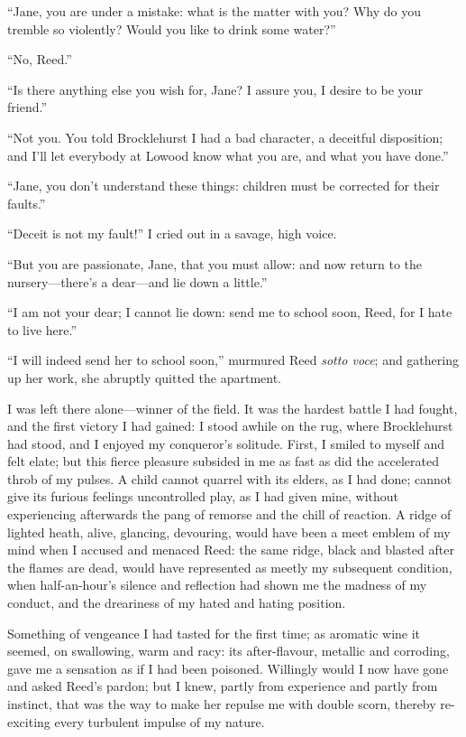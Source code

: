 \enquote{Jane, you are under a mistake: what is the matter with you? 
Why do you tremble so violently? Would you like to drink some water?}

\enquote{No, \Mrs{} Reed.}

\enquote{Is there anything else you wish for, Jane? I assure you, I
desire to be your friend.}

\enquote{Not you. You told \Mr{} Brocklehurst I had a bad character, a
deceitful disposition; and I'll let everybody at Lowood know what you
are, and what you have done.}

\enquote{Jane, you don't understand these things: children must be
corrected for their faults.}

\enquote{Deceit is not my fault!} I cried out in a savage, high voice.

\enquote{But you are passionate, Jane, that you must allow: and now
return to the nursery---there's a dear---and lie down a little.}

\enquote{I am not your dear; I cannot lie down: send me to school soon,
\Mrs{} Reed, for I hate to live here.}

\enquote{I will indeed send her to school soon,} murmured \Mrs{} Reed
\emph{sotto voce}; and gathering up her work, she abruptly quitted the
apartment.

I was left there alone---winner of the field. It was the hardest battle
I had fought, and the first victory I had gained: I stood awhile on the
rug, where \Mr{} Brocklehurst had stood, and I enjoyed my conqueror's
solitude. First, I smiled to myself and felt elate; but this fierce
pleasure subsided in me as fast as did the accelerated throb of my
pulses. A child cannot quarrel with its elders, as I had done; cannot
give its furious feelings uncontrolled play, as I had given mine,
without experiencing afterwards the pang of remorse and the chill of
reaction. A ridge of lighted heath, alive, glancing, devouring, would
have been a meet emblem of my mind when I accused and menaced \Mrs{} Reed:
the same ridge, black and blasted after the flames are dead, would have
represented as meetly my subsequent condition, when half-an-hour's
silence and reflection had shown me the madness of my conduct, and the
dreariness of my hated and hating position.

Something of vengeance I had tasted for the first time; as aromatic wine
it seemed, on swallowing, warm and racy: its after-flavour, metallic and
corroding, gave me a sensation as if I had been poisoned. Willingly
would I now have gone and asked \Mrs{} Reed's pardon; but I knew, partly
from experience and partly from instinct, that was the way to make her
repulse me with double scorn, thereby re-exciting every turbulent
impulse of my nature.

